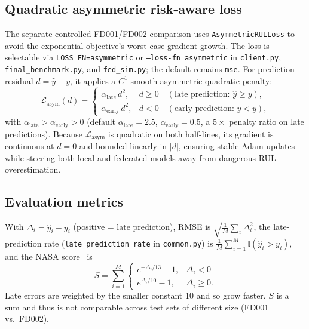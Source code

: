 \subsection{Quadratic asymmetric risk-aware loss}
The separate controlled FD001/FD002 comparison uses \texttt{AsymmetricRULLoss} to avoid the exponential objective's worst-case gradient growth. The loss is selectable via \texttt{LOSS\_FN=asymmetric} or \texttt{--loss-fn asymmetric} in \texttt{client.py}, \texttt{final\_benchmark.py}, and \texttt{fed\_sim.py}; the default remains \texttt{mse}. For prediction residual $d = \hat{y} - y$, it applies a $C^1$-smooth asymmetric quadratic penalty:
\begin{equation}
\mathcal{L}_{\text{asym}}(d) = \begin{cases}
\alpha_{\text{late}}\,d^2, & d \ge 0 \quad (\text{late prediction: }\hat{y} \ge y),\\
\alpha_{\text{early}}\,d^2, & d < 0 \quad (\text{early prediction: }\hat{y} < y),
\end{cases}
\end{equation}
with $\alpha_{\text{late}} > \alpha_{\text{early}} > 0$ (default $\alpha_{\text{late}}{=}2.5$, $\alpha_{\text{early}}{=}0.5$, a $5\times$ penalty ratio on late predictions). Because $\mathcal{L}_{\text{asym}}$ is quadratic on both half-lines, its gradient is continuous at $d=0$ and bounded linearly in $|d|$, ensuring stable Adam updates while steering both local and federated models away from dangerous RUL overestimation.

\subsection{Evaluation metrics}
With $\Delta_i=\hat y_i-y_i$ (positive = late prediction), RMSE is $\sqrt{\frac1M\sum_i\Delta_i^2}$, the late-prediction rate (\texttt{late\_prediction\_rate} in \texttt{common.py}) is $\frac{1}{M}\sum_{i=1}^{M}\mathbb{I}(\hat{y}_i > y_i)$, and the NASA score~\cite{saxena2008damage} is
\begin{equation}
S=\sum_{i=1}^{M}\begin{cases}e^{-\Delta_i/13}-1,&\Delta_i<0\\ e^{\Delta_i/10}-1,&\Delta_i\ge 0.\end{cases}
\end{equation}
Late errors are weighted by the smaller constant 10 and so grow faster. $S$ is a sum and thus is not comparable across test sets of different size (FD001 vs.\ FD002).


